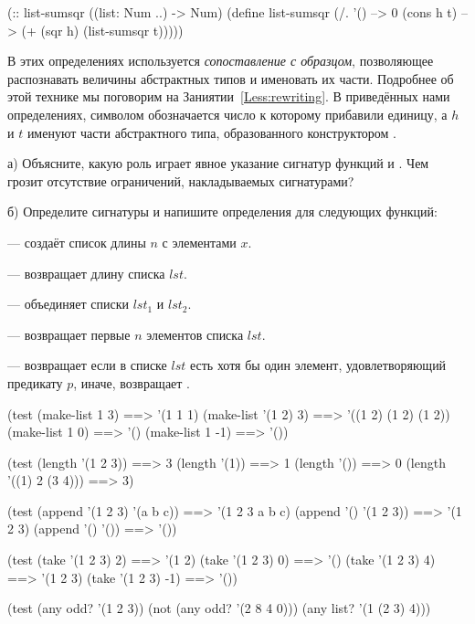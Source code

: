 \begin{SchemeCode}[emph={h,t}]
(:: list-sumsqr ((list: Num ..) -> Num)
 (define list-sumsqr
   (/. '() --> 0
       (cons h t) --> (+ (sqr h) (list-sumsqr t)))))
\end{SchemeCode}

В этих определениях используется \emph{сопоставление с образцом}, позволяющее распознавать величины абстрактных типов и именовать их части. Подробнее об этой технике мы поговорим на Заниятии~\ref{Less:rewriting}. В приведённых нами определениях, символом  обозначается число к которому прибавили единицу, а $h$ и $t$ именуют части абстрактного типа, образованного конструктором .

\newpage
\begin{Assignment}
а) Объясните, какую роль играет явное указание сигнатур функций  и . Чем грозит отсутствие ограничений, накладываемых сигнатурами?

\medskip
б) Определите сигнатуры и напишите определения для следующих функций:

 --- создаёт список длины $n$ с элементами $x$.

 --- возвращает длину списка $lst$.

 --- объединяет списки $lst_1$ и $lst_2$.

 --- возвращает первые $n$ элементов списка $lst$.

 --- возвращает  если в списке $lst$ есть хотя бы один элемент, удовлетворяющий предикату $p$, иначе, возвращает .

\begin{Specification}
(test 
  (make-list 1 3)      ==> '(1 1 1)
  (make-list '(1 2) 3) ==> '((1 2) (1 2) (1 2))
  (make-list 1 0)      ==> '()
  (make-list 1 -1)     ==> '())
\end{Specification}

\begin{Specification}
(test 
  (length '(1 2 3))       ==> 3
  (length '(1))           ==> 1
  (length '())            ==> 0
  (length '((1) 2 (3 4))) ==> 3)
\end{Specification}

\begin{Specification}
(test 
  (append '(1 2 3) '(a b c)) ==>  '(1 2 3 a b c)
  (append '() '(1 2 3))      ==>  '(1 2 3)
  (append '() '())           ==>  '())
\end{Specification}

\begin{Specification}
(test 
  (take '(1 2 3) 2)    ==>  '(1 2)
  (take '(1 2 3) 0)    ==>  '()
  (take '(1 2 3) 4)    ==>  '(1 2 3)
  (take '(1 2 3) -1)   ==>  '())
\end{Specification}

\begin{Specification}
(test 
  (any odd? '(1 2 3))
  (not (any odd? '(2 8 4 0)))
  (any list? '(1 (2 3) 4)))
\end{Specification}
\end{Assignment}

